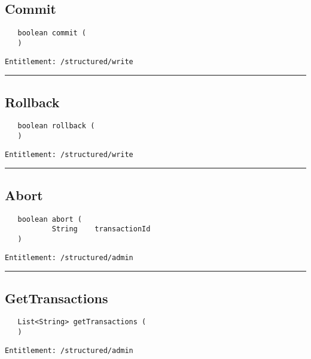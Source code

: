 \subsection{Commit}
\label{Api:Commit}
\begin{Verbatim}
   boolean commit (
   )
\end{Verbatim}
\begin{Verbatim}[formatcom=\color{Maroon}]
  Entitlement: /structured/write
\end{Verbatim}



\rule{12cm}{2pt}
\subsection{Rollback}
\label{Api:Rollback}
\begin{Verbatim}
   boolean rollback (
   )
\end{Verbatim}
\begin{Verbatim}[formatcom=\color{Maroon}]
  Entitlement: /structured/write
\end{Verbatim}



\rule{12cm}{2pt}
\subsection{Abort}
\label{Api:Abort}
\begin{Verbatim}
   boolean abort (
           String    transactionId
   )
\end{Verbatim}
\begin{Verbatim}[formatcom=\color{Maroon}]
  Entitlement: /structured/admin
\end{Verbatim}



\rule{12cm}{2pt}
\subsection{GetTransactions}
\label{Api:GetTransactions}
\begin{Verbatim}
   List<String> getTransactions (
   )
\end{Verbatim}
\begin{Verbatim}[formatcom=\color{Maroon}]
  Entitlement: /structured/admin
\end{Verbatim}



